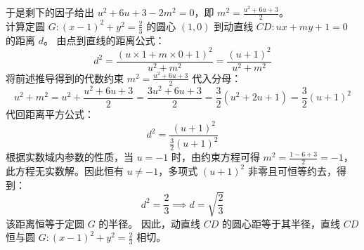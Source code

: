 \begin{solution}
于是剩下的因子给出 $u^2 + 6u + 3 - 2m^2 = 0$，即 $m^2 = \frac{u^2 + 6u + 3}{2}$。\\
计算定圆 $G: (x - 1)^2 + y^2 = \frac{2}{3}$ 的圆心 $(1, 0)$ 到动直线 $CD: ux + my + 1 = 0$ 的距离 $d$。
由点到直线的距离公式：
$$ d^2 = \frac{(u \times 1 + m \times 0 + 1)^2}{u^2 + m^2} = \frac{(u + 1)^2}{u^2 + m^2} $$
将前述推导得到的代数约束 $m^2 = \frac{u^2 + 6u + 3}{2}$ 代入分母：
$$ u^2 + m^2 = u^2 + \frac{u^2 + 6u + 3}{2} = \frac{3u^2 + 6u + 3}{2} = \frac{3}{2}(u^2 + 2u + 1) = \frac{3}{2}(u + 1)^2 $$
代回距离平方公式：
$$ d^2 = \frac{(u + 1)^2}{\frac{3}{2}(u + 1)^2} $$
根据实数域内参数的性质，当 $u = -1$ 时，由约束方程可得 $m^2 = \frac{1 - 6 + 3}{2} = -1$，此方程无实数解。因此恒有 $u \neq -1$，多项式 $(u + 1)^2$ 非零且可恒等约去，得到：
$$ d^2 = \frac{2}{3} \implies d = \sqrt{\frac{2}{3}} $$
该距离恒等于定圆 $G$ 的半径。
因此，动直线 $CD$ 的圆心距等于其半径，直线 $CD$ 恒与圆 $G: (x - 1)^2 + y^2 = \frac{2}{3}$ 相切。

\end{solution}



